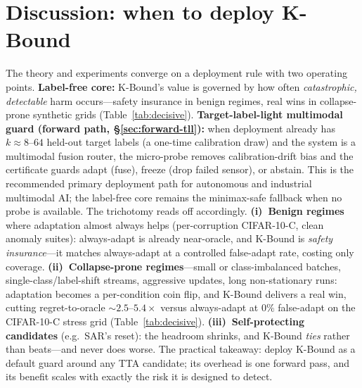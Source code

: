 \documentclass[conference]{IEEEtran}
\theoremstyle{plain}
\theoremstyle{definition}
\begin{document}
\section{Discussion: when to deploy K-Bound}\label{sec:discussion}
The theory and experiments converge on a deployment rule with two operating points.
\textbf{Label-free core:} K-Bound's value is governed by how often \emph{catastrophic, detectable}
harm occurs---safety insurance in benign regimes, real wins in collapse-prone synthetic grids
(Table~\ref{tab:decisive}). \textbf{Target-label-light multimodal guard (forward path,
\S\ref{sec:forward-tll}):} when deployment already has $k{\approx}8$--$64$ held-out target labels
(a one-time calibration draw) and the system is a multimodal fusion router, the micro-probe removes
calibration-drift bias and the certificate guards adapt (fuse), freeze (drop failed sensor), or
abstain. This is the recommended primary deployment path for autonomous and industrial multimodal AI;
the label-free core remains the minimax-safe fallback when no probe is available.
The trichotomy reads off accordingly. \textbf{(i)~Benign regimes} where adaptation
almost always helps (per-corruption CIFAR-10-C, clean anomaly suites): always-adapt is already
near-oracle, and K-Bound is \emph{safety insurance}---it matches always-adapt at a controlled
false-adapt rate, costing only coverage. \textbf{(ii)~Collapse-prone regimes}---small or
class-imbalanced batches, single-class/label-shift streams, aggressive updates, long
non-stationary runs: adaptation becomes a per-condition coin flip, and K-Bound delivers a real
win, cutting regret-to-oracle $\sim$$2.5$--$5.4\times$ versus always-adapt at $0\%$ false-adapt
on the CIFAR-10-C stress grid (Table~\ref{tab:decisive}). \textbf{(iii)~Self-protecting
candidates} (e.g.\ SAR's reset): the headroom shrinks, and K-Bound \emph{ties} rather than
beats---and never does worse. The practical takeaway: deploy K-Bound as a default guard around
any TTA candidate; its overhead is one forward pass, and its benefit scales with exactly the
risk it is designed to detect.
\clearpage
\end{document}

